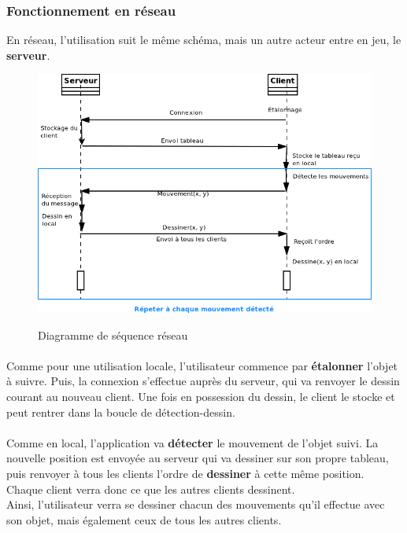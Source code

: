 \documentclass{report}
\begin{document}
				\subsubsection{Fonctionnement en réseau}
				En réseau, l'utilisation suit le même schéma, mais un autre acteur entre en jeu, le \textbf{serveur}.
				\begin{figure}[!h]
						\centering
						\includegraphics[scale=0.62]{../images/sequence_reseau.png}\\
						\caption{Diagramme de séquence réseau}
						\label{Diagramme de séquence réseau}
				\end{figure}
				\paragraph{}
				Comme pour une utilisation locale, l'utilisateur commence par \textbf{étalonner} l'objet à suivre. Puis, la connexion s'effectue auprès du serveur, qui va renvoyer le dessin courant au nouveau client. Une fois en possession du dessin, le client le stocke et peut rentrer dans la boucle de détection-dessin.
				\paragraph{}
				Comme en local, l'application va \textbf{détecter} le mouvement de l'objet suivi. La nouvelle position est envoyée au serveur qui va dessiner sur son propre tableau, puis renvoyer à tous les clients l'ordre de \textbf{dessiner} à cette même position. Chaque client verra donc ce que les autres clients dessinent. \\
				Ainsi, l'utilisateur verra se dessiner chacun des mouvements qu'il effectue avec son objet, mais également ceux de tous les autres clients.
\end{document}

